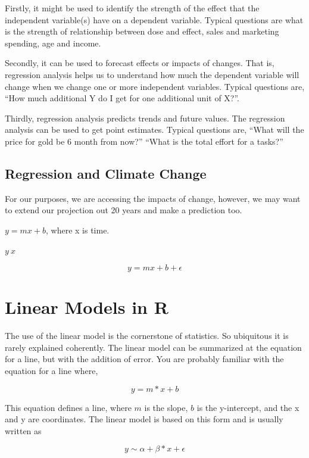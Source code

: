 \documentclass{article}\usepackage[]{graphicx}\usepackage[]{color}
\begin{document}
Firstly, it might be used to identify the strength of the effect that the independent variable(s) have on a dependent variable.  Typical questions are what is the strength of relationship between dose and effect, sales and marketing spending, age and income.

Secondly, it can be used to forecast effects or impacts of changes.  That is, regression analysis helps us to understand how much the dependent variable will change when we change one or more independent variables.  Typical questions are, “How much additional Y do I get for one additional unit of X?”.

Thirdly, regression analysis predicts trends and future values.  The regression analysis can be used to get point estimates.  Typical questions are, ``What will the price for gold be 6 month from now?'' ``What is the total effort for a tasks?''

\subsection{Regression and Climate Change}
For our purposes, we are accessing the impacts of change, however, we may want to extend our projection out 20 years and make a prediction too. 

$y =mx +b$, where x is time. 

$y ~ x$

\begin{equation}
y = mx + b + \epsilon
\end{equation}



\section{Linear Models in R}

The use of the linear model is the cornerstone of statistics. So ubiquitous it is rarely explained coherently. The linear model can be summarized at the equation for a line, but with the addition of error. You are probably familiar with the equation for a line where, 

\begin{equation}
y = m * x + b
\end{equation}

This equation defines a line, where $m$ is the slope, $b$ is the y-intercept, and the x and y are coordinates. The linear model is based on this form and is usually written as  

\begin{equation}
y \sim \alpha + \beta * x + \epsilon
\end{equation}
\end{document}

